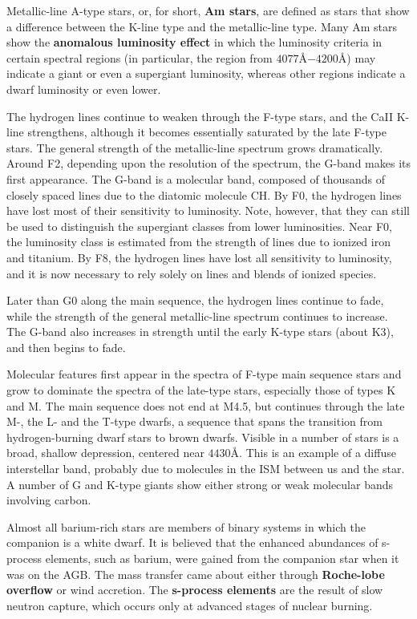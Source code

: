 \documentclass[a4paper,10pt]{article}
\begin{document}
{\noindent}Metallic-line A-type stars, or, for short, \textbf{Am stars}, are defined as stars that show a difference between the K-line type and the metallic-line type. Many Am stars show the \textbf{anomalous luminosity effect} in which the luminosity criteria in certain spectral regions (in particular, the region from $4077$\AA$-4200$\AA) may indicate a giant or even a supergiant luminosity, whereas other regions indicate a dwarf luminosity or even lower.

{\noindent}The hydrogen lines continue to weaken through the F-type stars, and the CaII K-line strengthens, although it becomes essentially saturated by the late F-type stars. The general strength of the metallic-line spectrum grows dramatically. Around F2, depending upon the resolution of the spectrum, the G-band makes its first appearance. The G-band is a molecular band, composed of thousands of closely spaced lines due to the diatomic molecule CH. By F0, the hydrogen lines have lost most of their sensitivity to luminosity. Note, however, that they can still be used to distinguish the supergiant classes from lower luminosities. Near F0, the luminosity class is estimated from the strength of lines due to ionized iron and titanium. By F8, the hydrogen lines have lost all sensitivity to luminosity, and it is now necessary to rely solely on lines and blends of ionized species.

{\noindent}Later than G0 along the main sequence, the hydrogen lines continue to fade, while the strength of the general metallic-line spectrum continues to increase. The G-band also increases in strength until the early K-type stars (about K3), and then begins to fade.

{\noindent}Molecular features first appear in the spectra of F-type main sequence stars and grow to dominate the spectra of the late-type stars, especially those of types K and M. The main sequence does not end at M4.5, but continues through the late M-, the L- and the T-type dwarfs, a sequence that spans the transition from hydrogen-burning dwarf stars to brown dwarfs. Visible in a number of stars is a broad, shallow depression, centered near $4430$\AA. This is an example of a diffuse interstellar band, probably due to molecules in the
ISM between us and the star. A number of G and K-type giants show either strong or weak molecular bands involving
carbon.

{\noindent}Almost all barium-rich stars are members of binary systems in which the companion is a white dwarf. It is believed that the enhanced abundances of s-process elements, such as barium, were gained from the companion star when it was on the AGB. The mass transfer came about either through \textbf{Roche-lobe overflow} or wind accretion. The \textbf{s-process elements} are the result of slow neutron capture, which occurs only at advanced stages of nuclear burning.
\end{document}
